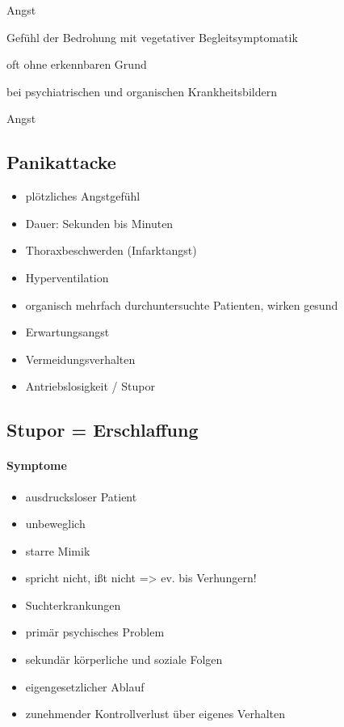 {\mdseries
Angst}

{\mdseries
Gef\"uhl der Bedrohung mit vegetativer  Begleitsymptomatik}

{\mdseries
oft ohne erkennbaren Grund}

{\mdseries
bei psychiatrischen und organischen  Krankheitsbildern}

{\mdseries
Angst}



\subsection{Panikattacke}

\begin{itemize}
    \item plötzliches Angstgef\"uhl
    \item Dauer: Sekunden bis Minuten
    \item Thoraxbeschwerden (Infarktangst)
    \item Hyperventilation
    \item organisch mehrfach durchuntersuchte  Patienten, wirken gesund
    \item Erwartungsangst
    \item Vermeidungsverhalten
    \item Antriebslosigkeit / Stupor
\end{itemize}



\subsection{Stupor = Erschlaffung}

\paragraph{Symptome}

\begin{itemize}
    \item ausdrucksloser Patient
    \item unbeweglich
    \item starre Mimik
    \item spricht nicht, i{\ss}t nicht ={\textgreater} ev. bis Verhungern!
    \item Suchterkrankungen
    \item primär psychisches Problem
    \item sekundär körperliche und soziale Folgen
    \item eigengesetzlicher Ablauf
    \item zunehmender Kontrollverlust \"uber  eigenes Verhalten
\end{itemize}



